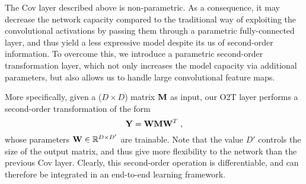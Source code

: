 The Cov layer described above is non-parametric. As a consequence, it may decrease the network capacity compared to the traditional way of exploiting the convolutional activations by passing them through a parametric fully-connected layer, and thus yield a less expressive model despite its us of second-order information. To overcome this, we introduce a parametric second-order transformation layer, which not only increases the model capacity via additional parameters, but also allows us to handle large convolutional feature maps.



More specifically, given a ($D \times D$) matrix ${\bf M}$ as input, our O2T layer performs a second-order transformation of the form
\begin{equation} \label{eq:o2t}
{\bf Y} = {\bf W} {\bf M} {\bf W}^T\;,
\end{equation}
whose parameters ${\bf W}  \in \mathbb{R}^{D \times D'} $ are trainable. Note that the value $D'$ controls the size of the output matrix, and thus give more flexibility to the network than the previous Cov layer. Clearly, this second-order operation is differentiable, and can therefore be integrated in an end-to-end learning framework.


